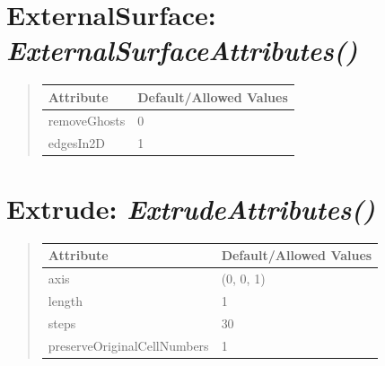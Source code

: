 \documentclass[letterpaper,10pt,english]{sphinxmanual}
\begin{document}
\section{\textbf{ExternalSurface}: \emph{ExternalSurfaceAttributes()}}
\label{attributes:externalsurface-externalsurfaceattributes}
\begin{DUlineblock}{0em}
\item[] 
\end{DUlineblock}
\begin{quote}

\begin{tabulary}{\linewidth}{|L|L|}
\hline

\textbf{Attribute}
 & 
\textbf{Default/Allowed Values}
\\
\hline
removeGhosts
 & 
0
\\
\hline
edgesIn2D
 & 
1
\\
\hline\end{tabulary}

\end{quote}

\begin{DUlineblock}{0em}
\item[] 
\end{DUlineblock}

\begin{DUlineblock}{0em}
\item[] 
\end{DUlineblock}


\section{\textbf{Extrude}: \emph{ExtrudeAttributes()}}
\label{attributes:extrude-extrudeattributes}
\begin{DUlineblock}{0em}
\item[] 
\end{DUlineblock}
\begin{quote}

\begin{tabulary}{\linewidth}{|L|L|}
\hline

\textbf{Attribute}
 & 
\textbf{Default/Allowed Values}
\\
\hline
axis
 & 
(0, 0, 1)
\\
\hline
length
 & 
1
\\
\hline
steps
 & 
30
\\
\hline
preserveOriginalCellNumbers
 & 
1
\\
\hline\end{tabulary}

\end{quote}
\end{document}

